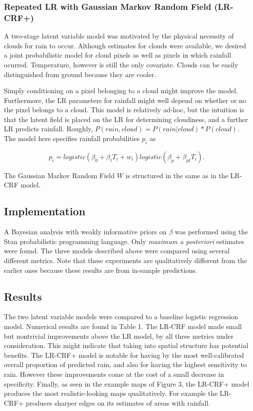 \subsubsection{Repeated LR with Gaussian Markov Random Field (LR-CRF+)}
A two-stage latent variable model was motivated by the physical necessity of clouds for rain to occur. Although estimates for clouds were available, we desired a joint probabilistic model for cloud pixels as well as pixels in which rainfall ocurred. Temperature, however is still the only covariate. Clouds can be easily distinguished from ground because they are cooler.

Simply conditioning on a pixel belonging to a cloud might improve the model. Furthermore, the LR parameters for rainfall might well depend on whether or no the pixel belongs to a cloud. This model is relatively ad-hoc, but the intuition is that the latent field is placed on the LR for determining cloudiness, and a further LR predicts rainfall. Roughly, $P(rain, cloud)= P(rain| cloud)*P(cloud)$. The model here specifies rainfall probabilities $p_i$ as

$$
p_i = logistic(\beta_0 + \beta_t T_i + w_i)  logistic(\beta_p + \beta_{pt} T_i).
$$

The Gaussian Markov Random Field $W$ is structured in the same as in the LR-CRF model.

\subsection{Implementation}
A Bayesian analysis with weakly informative priors on $\beta$ was performed using the Stan probabilistic programming language. Only \emph{maximum a posteriori} estimates were found. The three models described above were compared using several different metrics. Note that these experiments are qualitatively different from the earlier ones because these results are from in-sample predictions.

\subsection{Results}
The two latent variable models were compared to a baseline logistic regression model. Numerical results are found in Table 1. The LR-CRF model made small but nontrivial improvements above the LR model, by all three metrics under consideration. This might indicate that taking into spatial structure has potential benefits. The LR-CRF+ model is notable for having by the most well-calibrated overall proportion of predicted rain, and also for having the highest sensitivity to rain. However these improvements come at the cost of a small decrease in specificity. Finally, as seen in the example maps of Figure 3, the LR-CRF+ model produces the most realistic-looking maps qualitatively. For example the LR-CRF+ produces sharper edges on its estimates of areas with rainfall.

